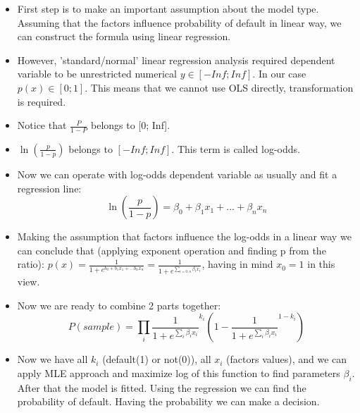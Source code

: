 \documentclass{article}
\begin{document}
\begin{itemize}
    \item First step is to make an important assumption about the model type. Assuming that the factors influence probability of default in linear way, we can construct the formula using linear regression.
    \item However, 'standard/normal' linear regression analysis required dependent variable to be unrestricted numerical $y \in [-Inf;Inf]$. In our case $p(x) \in [0;1]$. This means that we cannot use OLS directly, transformation is required.
    \item Notice that $\frac{P}{1-P}$ belongs to [0; Inf]. 
    \item $\ln(\frac{p}{1-p})$ belongs to $[-Inf; Inf]$. This term is called log-odds. 
    \item Now we can operate with log-odds dependent variable as usually and fit a regression line: 
    $$\ln(\frac{p}{1-p}) = \beta_0 + \beta_1 x_1 + ... + \beta_n x_n$$
    \item Making the assumption that factors influence the log-odds in a linear way we can conclude that (applying exponent operation and finding p from the ratio):
$p(x) = \frac{1}{1 + e^{b_0 + b_1x_1 + ...b_nx_n}} = \frac{1}{1 + e^{\sum_{i=0:n} \beta_i x_i}}$, having in mind $x_0 = 1$ in this view.
    \item Now we are ready to combine 2 parts together:
    $$P(sample) = \prod_i \frac{1}{1 + e^{\sum_{i} \beta_i x_i}}^{k_i}(1-\frac{1}{1 + e^{\sum_{i} \beta_i x_i}}^{1-k_i})$$
    \item Now we have all $k_i$ (default(1) or not(0)),  all $x_i$ (factors values), and we can apply MLE approach and maximize log of this function to find parameters $\beta_i$. After that the model is fitted. Using the regression we can find the probability of default. Having the probability we can make a decision.
\end{itemize}
\end{document}
